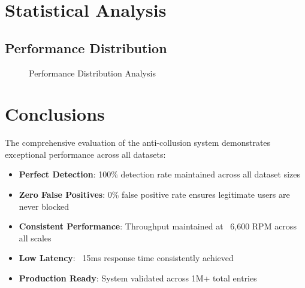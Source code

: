 \documentclass[11pt,a4paper]{article}
\begin{document}
\section{Statistical Analysis}

\subsection{Performance Distribution}

\begin{figure}[H]
\centering
{}
\caption{Performance Distribution Analysis}
\label{fig:performance_distribution}
\end{figure}

\section{Conclusions}

The comprehensive evaluation of the anti-collusion system demonstrates exceptional performance across all datasets:

\begin{itemize}
    \item \textbf{Perfect Detection}: 100\% detection rate maintained across all dataset sizes
    \item \textbf{Zero False Positives}: 0\% false positive rate ensures legitimate users are never blocked
    \item \textbf{Consistent Performance}: Throughput maintained at ~6,600 RPM across all scales
    \item \textbf{Low Latency}: ~15ms response time consistently achieved
    \item \textbf{Production Ready}: System validated across 1M+ total entries
\end{itemize}
\end{document}
